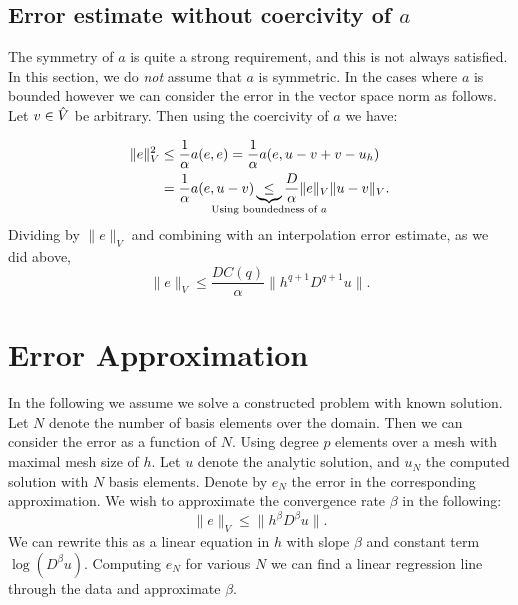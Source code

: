 \subsection{Error estimate without coercivity of \(a\)}
\label{ssec:error_estimate_cea}
The symmetry of \( a \) is quite a strong requirement, and this is not always
satisfied. In this section, we do \emph{not} assume that \( a \) is symmetric.
In the cases where \( a \) is bounded however we can consider the error in the
vector space norm as follows. Let \( v \in \hat{V} \) be arbitrary. Then using
the coercivity of \( a \) we have:

\begin{align}
    \| e \|_V^2 &\leq \frac{1}{\alpha} a(e, e) = \frac{1}{\alpha}a(e, u- v + v - u_h) \\
                &= \frac{1}{\alpha} a(e, u - v)
                \underbrace{\leq}_{\mathclap{\text{Using boundedness of \(a
        \)}}} \frac{D}{\alpha}\| e \|_V \| u - v \|_V.
\end{align}
Dividing by \( \|e\|_V \) and combining with an interpolation error estimate,
as we did above, 
\begin{equation}
    \|e \|_V \leq \frac{D C(q)}{\alpha} \|h^{q+1} D^{q+1}u \|.
\end{equation}

\section{Error Approximation}

In the following we assume we solve a constructed problem with known solution.
Let \( N \) denote the number of basis elements over the domain. Then we can
consider the error as a function of \( N \). Using degree \( p \) elements over
a mesh with maximal mesh size of \( h \). Let \( u \) denote the analytic
solution, and \( u_N \) the computed solution with \( N \) basis elements.
Denote by \( e_N \) the error in the corresponding approximation.
We wish to approximate the convergence rate \( \beta \) in the following:
\begin{equation}
    \| e \|_V \leq \| h^\beta D^\beta u \|.
\end{equation}
We can rewrite this as a linear equation in \( h \) with slope \(\beta\) and
constant term \( \log(D^\beta u) \). Computing \( e_N \) for various \( N \) we
can find a linear regression line through the data and approximate \( \beta \).
